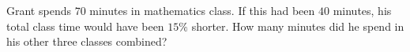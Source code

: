 Grant spends $70$ minutes in mathematics class. If this had been $40$ minutes, his total class time would have been $15\%$ shorter. How many minutes did he spend in his other three classes combined?
